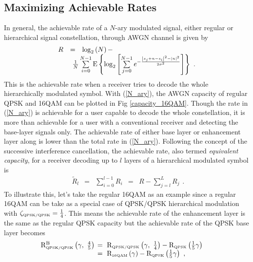 \documentclass[conference]{IEEEtran}
\begin{document}
\subsection{Maximizing Achievable Rates~\label{Info_Theory}}
In general, the achievable rate of a $N$-ary modulated signal,
either regular or hierarchical signal constellation, through AWGN
channel is given by~\cite{Unge82}
\begin{equation}
\begin{array}{lcl}
R&=&\log_{2}\left(N\right)-\\
&&\hspace{-0.20in}\frac{1}{N}\sum\limits_{i=0}^{N-1}\mbox{E}\left\{\log_{2}\left[\sum\limits_{j=0}^{N-1}e^{-\frac{\left|s_{j}+n-s_{i}\right|^2-\left|n\right|^2}{2\sigma^2}}\right]\right\}\
.
\end{array}\label{N_ary}
\end{equation}
\noindent This is the achievable rate when a receiver tries to
decode the whole hierarchically modulated symbol. With
(\ref{N_ary}), the AWGN capacity of regular QPSK and 16QAM can be
plotted in Fig \ref{capacity_16QAM}. Though the rate in
(\ref{N_ary}) is achievable for a user capable to decode the whole
constellation, it is more than achievable for a user with a
conventional receiver and detecting the base-layer signals only.
The achievable rate of either base layer or enhancement layer
along is lower than the total rate in (\ref{N_ary}). Following the
concept of the successive interference cancellation, the
achievable rate, also termed {\em equivalent capacity}, for a
receiver decoding up to $l$ layers of a hierarchical modulated
symbol is~\cite{Huber94}
\begin{equation}
\begin{array}{rcccl}
\tilde{R}_{l}&=&\sum\limits_{i=0}^{l-1}R_{i}& = &
R-\sum\limits_{j=l}^{L}{R}_{j}
\end{array}.\label{R_equiv}
\end{equation}
\noindent To illustrate this, let's take the regular 16QAM as an
example since a regular 16QAM can be take as a special case of
QPSK/QPSK hierarchical modulation with $\zeta_{\mbox{\tiny
QPSK/QPSK}}=\frac{1}{4}$. This means the achievable rate of the
enhancement layer is the same as the regular QPSK capacity but the
achievable rate of the QPSK base layer becomes
\begin{equation}\hspace{-0.2in}
\begin{array}{rl}
{\rm R}_{\mbox{\tiny QPSK/QPSK}}^{\rm B}\left(\gamma,\
\frac{4}{5}\right)&\hspace{-0.08in}=\ {\rm R}_{\mbox{\tiny
QPSK/QPSK}}\left(\gamma,\
\frac{1}{4}\right)-{\rm R}_{\mbox{\tiny QPSK}} \left(\frac{1}{5}\gamma\right)\\
&\hspace{-0.08in}=\ {\rm R}_{\mbox{\tiny
16QAM}}\left(\gamma\right)-{\rm R}_{\mbox{\tiny
QPSK}}\left(\frac{1}{5}\gamma\right)\ ,
\end{array}\label{R_16QAM_B1}
\end{equation}
\end{document}

